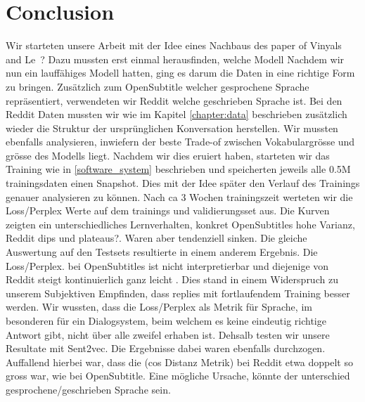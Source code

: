 \chapter{Conclusion}
Wir starteten unsere Arbeit mit der Idee eines Nachbaus des paper of Vinyals and Le~\cite{Vinyals:2015}? Dazu mussten erst einmal herausfinden, welche Modell 
Nachdem wir nun ein lauffähiges Modell hatten, ging es darum die Daten in eine richtige Form zu bringen. Zusätzlich zum OpenSubtitle welcher gesprochene Sprache repräsentiert, verwendeten wir Reddit welche geschrieben Sprache ist.  Bei den Reddit Daten mussten wir wie im Kapitel \ref{chapter:data} beschrieben zusätzlich wieder die Struktur der ursprünglichen Konversation herstellen. Wir mussten ebenfalls analysieren, inwiefern der beste Trade-of zwischen Vokabulargrösse und grösse des Modells liegt.
Nachdem wir dies eruiert haben, starteten wir das Training wie in \ref{software_system} beschrieben und speicherten jeweils alle 0.5M trainingsdaten einen Snapshot. Dies mit der Idee später den Verlauf des Trainings genauer analysieren zu können. Nach ca 3 Wochen trainingszeit werteten wir die Loss/Perplex Werte auf dem trainings und validierungsset aus. Die Kurven zeigten ein unterschiedliches Lernverhalten, konkret OpenSubtitles hohe Varianz, Reddit dips und plateaus?. Waren aber tendenziell sinken. Die gleiche Auswertung auf den Testsets resultierte in einem anderem Ergebnis. Die Loss/Perplex. bei OpenSubtitles ist nicht interpretierbar und diejenige von Reddit steigt kontinuierlich ganz leicht . Dies stand in einem Widerspruch zu unserem Subjektiven Empfinden, dass replies mit fortlaufendem Training besser werden.
Wir wussten, dass die Loss/Perplex als Metrik für Sprache, im besonderen für ein Dialogsystem, beim welchem es keine eindeutig richtige Antwort gibt, nicht über alle zweifel erhaben ist. Dehsalb testen wir unsere Resultate mit Sent2vec. Die Ergebnisse dabei waren ebenfalls durchzogen. Auffallend hierbei war, dass die (cos Distanz Metrik) bei Reddit etwa doppelt so gross war, wie bei OpenSubtitle. Eine mögliche Ursache, könnte der unterschied gesprochene/geschrieben Sprache sein.

